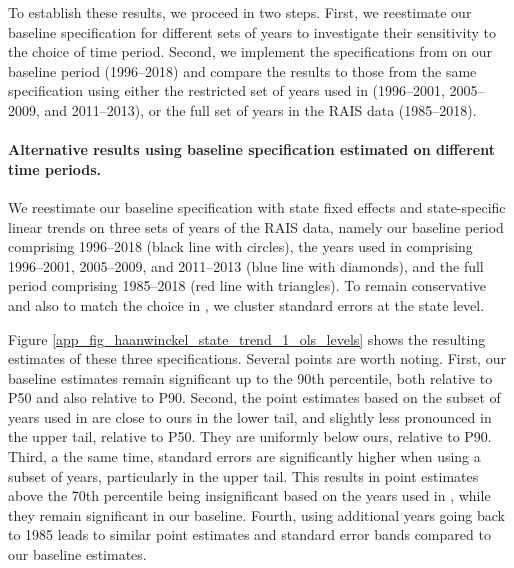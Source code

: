 To establish these results, we proceed in two steps. First, we reestimate our baseline specification for different sets of years to investigate their sensitivity to the choice of time period. Second, we implement the specifications from  on our baseline period (1996--2018) and compare the results to those from the same specification using either the restricted set of years used in  (1996--2001, 2005--2009, and 2011--2013), or the full set of years in the RAIS data (1985--2018).


\paragraph{Alternative results using baseline specification estimated on different time periods.}

We reestimate our baseline specification with state fixed effects and state-specific linear trends on three sets of years of the RAIS data, namely our baseline period comprising 1996--2018 (black line with circles), the years used in  comprising 1996--2001, 2005--2009, and 2011--2013 (blue line with diamonds), and the full period comprising 1985--2018 (red line with triangles). To remain conservative and also to match the choice in , we cluster standard errors at the state level.

Figure \ref{app_fig_haanwinckel_state_trend_1_ols_levels} shows the resulting estimates of these three specifications. Several points are worth noting. First, our baseline estimates remain significant up to the 90th percentile, both relative to P50 and also relative to P90. Second, the point estimates based on the subset of years used in  are close to ours in the lower tail, and slightly less pronounced in the upper tail, relative to P50. They are uniformly below ours, relative to P90. Third, a the same time, standard errors are significantly higher when using a subset of years, particularly in the upper tail. This results in point estimates above the 70th percentile being insignificant based on the years used in , while they remain significant in our baseline. Fourth, using additional years going back to 1985 leads to similar point estimates and standard error bands compared to our baseline estimates.


